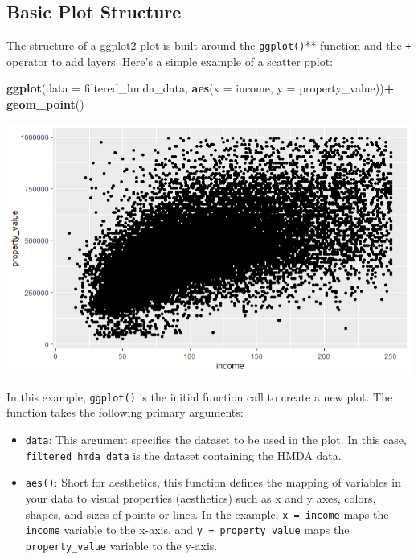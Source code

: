 \documentclass[
]{book}
\newenvironment{Shaded}{\begin{snugshade}}{\end{snugshade}}
\newcommand{\AttributeTok}[1]{\textcolor[rgb]{0.13,0.29,0.53}{#1}}
\newcommand{\FunctionTok}[1]{\textcolor[rgb]{0.13,0.29,0.53}{\textbf{#1}}}
\newcommand{\NormalTok}[1]{#1}
\newcommand{\SpecialCharTok}[1]{\textcolor[rgb]{0.81,0.36,0.00}{\textbf{#1}}}
\providecommand{\tightlist}{%
  \setlength{\itemsep}{0pt}\setlength{\parskip}{0pt}}
\begin{document}
\hypertarget{basic-plot-structure}{%
\subsection*{Basic Plot Structure}\label{basic-plot-structure}}

The structure of a ggplot2 plot is built around the \texttt{ggplot()}** function and the \texttt{+} operator to add layers. Here's a simple example of a scatter pplot:

\begin{Shaded}
\begin{Highlighting}[]
\FunctionTok{ggplot}\NormalTok{(}\AttributeTok{data =}\NormalTok{ filtered\_hmda\_data, }\FunctionTok{aes}\NormalTok{(}\AttributeTok{x =}\NormalTok{ income, }\AttributeTok{y =}\NormalTok{ property\_value))}\SpecialCharTok{+}
  \FunctionTok{geom\_point}\NormalTok{()}
\end{Highlighting}
\end{Shaded}

\includegraphics{images/basic_plot_structure_img_1.PNG}

In this example, \texttt{ggplot()} is the initial function call to create a new plot. The function takes the following primary arguments:

\begin{itemize}
\tightlist
\item
  \texttt{data}: This argument specifies the dataset to be used in the plot. In this case, \texttt{filtered\_hmda\_data} is the dataset containing the HMDA data.
\item
  \texttt{aes()}: Short for aesthetics, this function defines the mapping of variables in your data to visual properties (aesthetics) such as x and y axes, colors, shapes, and sizes of points or lines. In the example, \texttt{x\ =\ income} maps the \texttt{income} variable to the x-axis, and \texttt{y\ =\ property\_value} maps the \texttt{property\_value} variable to the y-axis.
\end{itemize}
\end{document}
